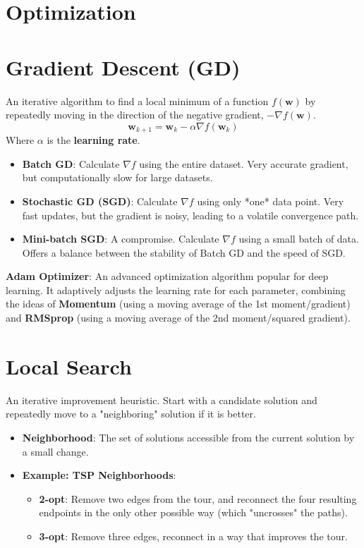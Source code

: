 \documentclass[8pt,a4paper,twocolumn]{article}
\newcommand{\ww}{\mathbf{w}}
\newcommand{\0}{\mathbf{0}}
\begin{document}
\section*{Optimization}

\section*{Gradient Descent (GD)}
An iterative algorithm to find a local minimum of a function $f(\ww)$ by repeatedly moving in the direction of the negative gradient, $-\nabla f(\ww)$.
\[ 
 \ww_{k+1} = \ww_k - \alpha \nabla f(\ww_k) 
\]
Where $\alpha$ is the \textbf{learning rate}.

\begin{itemize}
    \item \textbf{Batch GD}: Calculate $\nabla f$ using the entire dataset. Very accurate gradient, but computationally slow for large datasets.
    \item \textbf{Stochastic GD (SGD)}: Calculate $\nabla f$ using only *one* data point. Very fast updates, but the gradient is noisy, leading to a volatile convergence path.
    \item \textbf{Mini-batch SGD}: A compromise. Calculate $\nabla f$ using a small batch of data. Offers a balance between the stability of Batch GD and the speed of SGD.
\end{itemize}

\textbf{Adam Optimizer}: An advanced optimization algorithm popular for deep learning. It adaptively adjusts the learning rate for each parameter, combining the ideas of \textbf{Momentum} (using a moving average of the 1st moment/gradient) and \textbf{RMSprop} (using a moving average of the 2nd moment/squared gradient).

\section*{Local Search}
An iterative improvement heuristic. Start with a candidate solution and repeatedly move to a "neighboring" solution if it is better.
\begin{itemize}
    \item \textbf{Neighborhood}: The set of solutions accessible from the current solution by a small change.
    \item \textbf{Example: TSP Neighborhoods}:
    \begin{itemize}
        \item \textbf{2-opt}: Remove two edges from the tour, and reconnect the four resulting endpoints in the only other possible way (which "uncrosses" the paths).
        \item \textbf{3-opt}: Remove three edges, reconnect in a way that improves the tour.
    \end{itemize}
\end{itemize}
\end{document}
